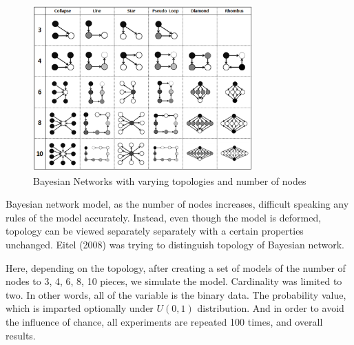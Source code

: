 	\begin{figure}[!h]
	\centering
		\includegraphics[height=180pt]{Topologies}
		\caption{Bayesian Networks with varying topologies and number of nodes}
	\end{figure}

Bayesian network model, as the number of nodes increases, difficult speaking any rules of the model accurately. Instead, even though the model is deformed, topology can be viewed separately separately with a certain properties unchanged. Eitel (2008) was trying to distinguish topology of Bayesian network.

Here, depending on the topology, after creating a set of models of the number of nodes to 3, 4, 6, 8, 10 pieces, we simulate the model. Cardinality was limited to two. In other words, all of the variable is the binary data. The probability value, which is imparted optionally under $ U (0,1) $ distribution. And in order to avoid the influence of chance, all experiments are repeated 100 times, and overall results.
